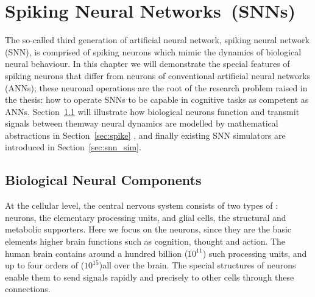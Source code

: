 \chapter{Spiking Neural Networks~(SNNs)}
\label{cha:bkg}
The so-called third generation of artificial neural network, \DIFaddbegin {}\DIFaddend spiking neural network (SNN), is comprised of spiking neurons which mimic the dynamics of biological neural behaviour.
In this chapter we will demonstrate the special features of spiking neurons that differ from neurons of conventional artificial neural networks (ANNs);
these \DIFdelbegin {}\DIFdelend \DIFaddbegin {}\DIFaddend neuronal operations are the root of the research problem raised in the thesis: how to operate SNNs to be capable in cognitive tasks \DIFaddbegin {}\DIFaddend as competent as ANNs.
Section~\ref{sec:bio_neuron} will illustrate how biological neurons function and transmit signals between them\DIFdelbegin {}\DIFdelend \DIFaddbegin {}\DIFaddend way neural dynamics are modelled by mathematical abstractions \DIFdelbegin {}\DIFdelend \DIFaddbegin {}\DIFaddend in Section~\ref{sec:spike} , and finally \DIFdelbegin {}\DIFdelend existing SNN simulators are introduced in Section~\ref{sec:snn_sim}.

\section{Biological Neural Components}
\label{sec:bio_neuron}
At the cellular level, the central nervous system consists of two types of \DIFdelbegin {}\DIFdelend \DIFaddbegin {}\DIFaddend : neurons, the elementary processing units, and glial cells, the structural and metabolic supporters. 
Here we focus on the neurons, since they are the basic elements \DIFdelbegin {}\DIFdelend \DIFaddbegin {}\DIFaddend higher brain functions such as cognition, thought and action. %
The human brain contains around a hundred billion ($10^{11}$) such processing units, and up to four orders of \DIFdelbegin {}\DIFdelend \DIFaddbegin {}\DIFaddend ($10^{15}$)\DIFaddbegin \DIFadd{, }\DIFaddend all over the brain.
The special structures of neurons enable them to send signals rapidly and precisely to other cells through these connections.
